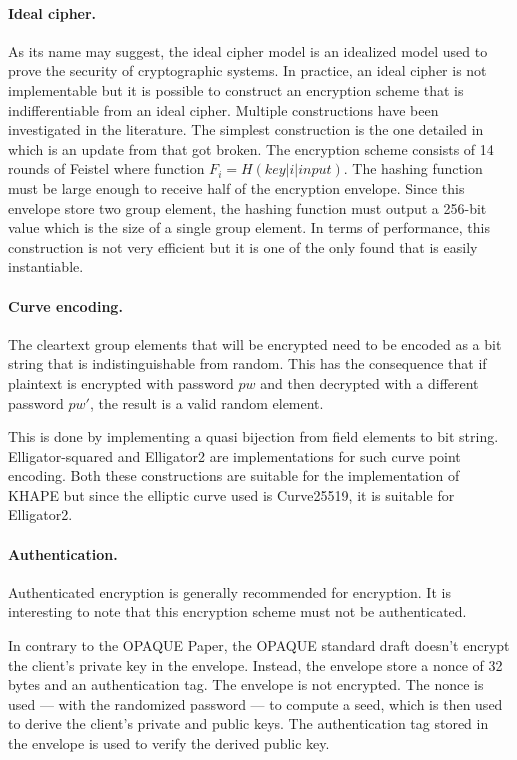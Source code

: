 ﻿\documentclass[../report.tex]{subfiles}
\begin{document}
\paragraph{Ideal cipher.}
As its name may suggest, the ideal cipher model is an idealized model used to prove the security of cryptographic systems.
In practice, an ideal cipher is not implementable %
but it is possible to construct an encryption scheme that is indifferentiable from an ideal cipher. Multiple constructions have been investigated in the literature.
The simplest construction is the one detailed in \cite{Ideal_Cipher_2} which is an update from \cite{Ideal_Cipher_1} that got broken.
The encryption scheme consists of 14 rounds of Feistel where function $F_i = H(key | i | input)$.
The hashing function must be large enough to receive half of the encryption envelope. Since this envelope store two group element, the hashing function must output a 256-bit value which is the size of a single group element.
In terms of performance, this construction is not very efficient but it is one of the only found that is easily instantiable.

\paragraph{Curve encoding.}
The cleartext group elements that will be encrypted need to be encoded as a bit string that is indistinguishable from random. This has the consequence that if plaintext is encrypted with password $pw$ and then decrypted with a different password $pw'$, the result is a valid random element.

This is done by implementing a quasi bijection from field elements to bit string.
Elligator-squared \cite{Elligator_Squared_Paper} and Elligator2 \cite{Elligator2_Paper} are implementations for such curve point encoding.
Both these constructions are suitable for the implementation of KHAPE but since the elliptic curve used is Curve25519, it is suitable for Elligator2.
\paragraph{Authentication.}
Authenticated encryption is generally recommended for encryption.
It is interesting to note that this encryption scheme must not be authenticated. 

In contrary to the OPAQUE Paper, the OPAQUE standard draft doesn't encrypt the client's private key in the envelope.
Instead, the envelope store a nonce of 32 bytes and an authentication tag. The envelope is not encrypted.
The nonce is used --- with the randomized password --- to compute a seed, which is then used to derive the client's private and public keys. The authentication tag stored in the envelope is used to verify the derived public key.
\end{document}
